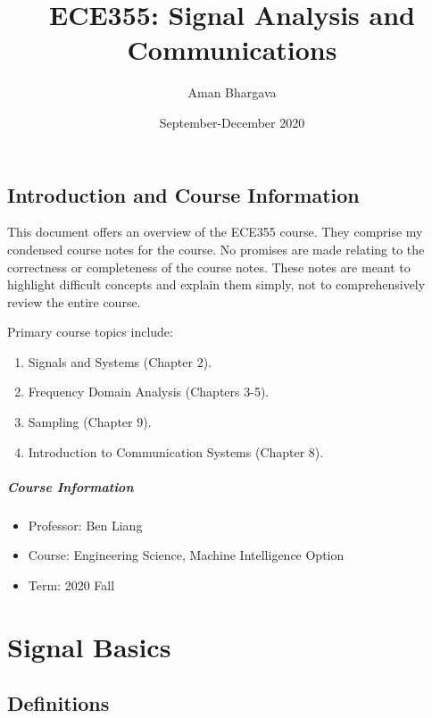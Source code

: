 \documentclass[a4paper,12pt]{report}
\begin{document}
\title{ECE355: Signal Analysis and Communications}
\author{Aman Bhargava}
\date{September-December 2020}
\maketitle

\tableofcontents

\section{Introduction and Course Information}

This document offers an overview of the ECE355 course. They comprise my condensed course notes for the course. No promises are made relating to the correctness or completeness of the course notes. These notes are meant to highlight difficult concepts and explain them simply, not to comprehensively review the entire course.

Primary course topics include:

\begin{enumerate}
\item Signals and Systems (Chapter 2).
\item Frequency Domain Analysis (Chapters 3-5).
\item Sampling (Chapter 9).
\item Introduction to Communication Systems (Chapter 8).
\end{enumerate}

\paragraph{Course Information}
\begin{itemize}
\item Professor: Ben Liang
\item Course: Engineering Science, Machine Intelligence Option
\item Term: 2020 Fall
\end{itemize}




\chapter{Signal Basics}

\section{Definitions}
\end{document}
